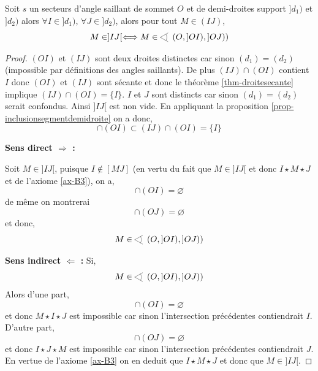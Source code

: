 \begin{prop}\label{prop-barrtrans}
    Soit $s$ un secteurs d'angle saillant de sommet $O$ et de demi-droites support $]d_1)$ et $]d_2)$ alors $\forall I\in ]d_1)$, $\forall J\in ]d_2)$, alors pour tout $M\in (IJ)$,
    \begin{equation*}
        M\in]IJ[ \Longleftrightarrow M \in \anglesaillant\left({O},{]OI)},{]OJ)}\right)
    \end{equation*}
\begin{proof}

    $(OI)$ et $(IJ)$ sont deux droites distinctes car sinon $(d_1)=(d_2)$ (impossible par définitions des angles saillants). De plus $(IJ)\cap(OI)$ contient $I$ donc $(OI)$ et $(IJ)$ sont sécante et donc le théorème \ref{thm-droitesecante} implique $(IJ)\cap(OI)=\{I\}$. $I$ et $J$ sont distincts car sinon $(d_1)=(d_2)$ serait confondus. Ainsi $]IJ[$ est non vide. En appliquant la proposition \ref{prop-inclusionsegmentdemidroite} on a donc,
    \begin{equation*}
        [MJ]\cap (OI) \subset (IJ)\cap (OI) = \{I\}
    \end{equation*}
    
    \textbf{Sens direct $\Longrightarrow$ : }

    Soit $M\in]IJ[$, puisque $I \notin [MJ]$ (en vertu du fait que $M\in ]IJ[$ et donc $I\star M \star J$ et de l'axiome \ref{ax-B3}), on a,
    \begin{equation*}
        [MJ]\cap (OI)  = \varnothing
    \end{equation*}
    de même on montrerai
    \begin{equation*}
        [MI]\cap (OJ)  = \varnothing
    \end{equation*}  
    et donc,
    \begin{equation*}
        M \in \anglesaillant\left({O},{]OI)},{]OJ)}\right)
    \end{equation*}

\textbf{Sens indirect $\Longleftarrow$ : }
    Si,
    \begin{equation*}
        M \in \anglesaillant\left({O},{]OI)},{]OJ)}\right)
    \end{equation*}
    Alors d'une part,
    \begin{equation*}
        [MJ]\cap (OI)  = \varnothing
    \end{equation*}
    et donc $M\star I\star J$ est impossible car sinon l'intersection précédentes contiendrait $I$. D'autre part, 
    \begin{equation*}
        [MI]\cap (OJ)  = \varnothing
    \end{equation*}
    et donc $I\star J\star M$ est impossible car sinon l'intersection précédentes contiendrait $J$. En vertue de l'axiome \ref{ax-B3} on en deduit que $I\star M \star J$ et donc que $M\in ]IJ[$.
\end{proof}
\end{prop}
